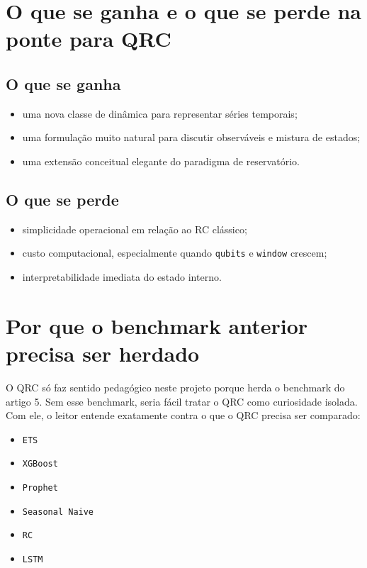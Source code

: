 \documentclass[12pt]{article}
\providecommand{\tightlist}{%
          \setlength{\itemsep}{0pt}\setlength{\parskip}{0pt}}
\begin{document}
\section{O que se ganha e o que se perde na ponte para QRC}\label{8-o-que-se-ganha-e-o-que-se-perde-na-ponte-para-qrc}

\subsection{O que se ganha}\label{81-o-que-se-ganha}

\begin{itemize}
\tightlist
\item
  uma nova classe de dinâmica para representar séries temporais;
\item
  uma formulação muito natural para discutir observáveis e mistura de estados;
\item
  uma extensão conceitual elegante do paradigma de reservatório.
\end{itemize}

\subsection{O que se perde}\label{82-o-que-se-perde}

\begin{itemize}
\tightlist
\item
  simplicidade operacional em relação ao RC clássico;
\item
  custo computacional, especialmente quando \texttt{qubits} e \texttt{window} crescem;
\item
  interpretabilidade imediata do estado interno.
\end{itemize}

\section{Por que o benchmark anterior precisa ser herdado}\label{9-por-que-o-benchmark-anterior-precisa-ser-herdado}

O QRC só faz sentido pedagógico neste projeto porque herda o benchmark do artigo 5. Sem esse benchmark, seria fácil tratar o QRC como curiosidade isolada. Com ele, o leitor entende exatamente contra o que o QRC precisa ser comparado:

\begin{itemize}
\tightlist
\item
  \texttt{ETS}
\item
  \texttt{XGBoost}
\item
  \texttt{Prophet}
\item
  \texttt{Seasonal\ Naive}
\item
  \texttt{RC}
\item
  \texttt{LSTM}
\end{itemize}
\end{document}
